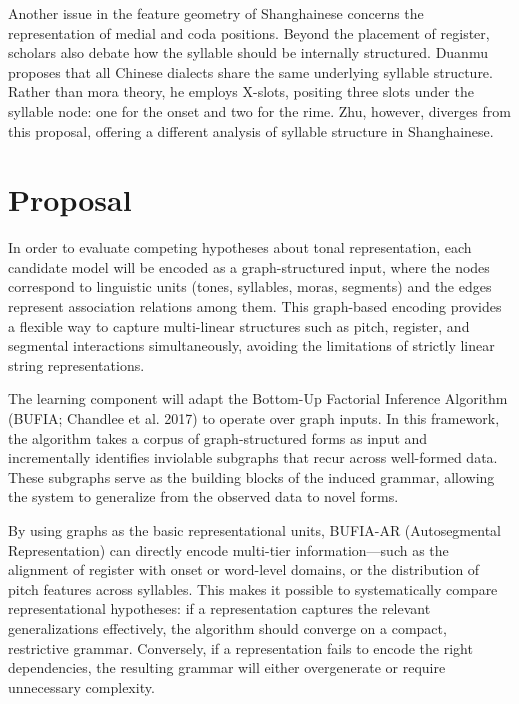 \documentclass[11pt]{article}
\begin{document}
Another issue in the feature geometry of Shanghainese concerns the 
representation of medial and coda positions. Beyond the placement of register, 
scholars also debate how the syllable should be internally structured. Duanmu 
proposes that all Chinese dialects share the same underlying syllable 
structure. Rather than mora theory, he employs X-slots, positing three slots 
under the syllable node: one for the onset and two for the rime. Zhu, however, 
diverges from this proposal, offering a different analysis of syllable 
structure in Shanghainese.

\section{Proposal}
In order to evaluate competing hypotheses about tonal representation, each 
candidate model will be encoded as a graph-structured input, where the nodes 
correspond to linguistic units (tones, syllables, moras, segments) and the 
edges represent association relations among them. This graph-based encoding 
provides a flexible way to capture multi-linear structures such as pitch, 
register, and segmental interactions simultaneously, avoiding the limitations 
of strictly linear string representations.

The learning component will adapt the Bottom-Up Factorial Inference Algorithm 
(BUFIA; Chandlee et al. 2017) to operate over graph inputs. In this framework, 
the algorithm takes a corpus of graph-structured forms as input and 
incrementally identifies inviolable subgraphs that recur across well-formed 
data. These subgraphs serve as the building blocks of the induced grammar, 
allowing the system to generalize from the observed data to novel forms.

By using graphs as the basic representational units, BUFIA-AR (Autosegmental 
Representation) can directly encode multi-tier information—such as the 
alignment of register with onset or word-level domains, or the distribution of 
pitch features across syllables. This makes it possible to systematically 
compare representational hypotheses: if a representation captures the relevant 
generalizations effectively, the algorithm should converge on a compact, 
restrictive grammar. Conversely, if a representation fails to encode the right 
dependencies, the resulting grammar will either overgenerate or require 
unnecessary complexity.
\end{document}
